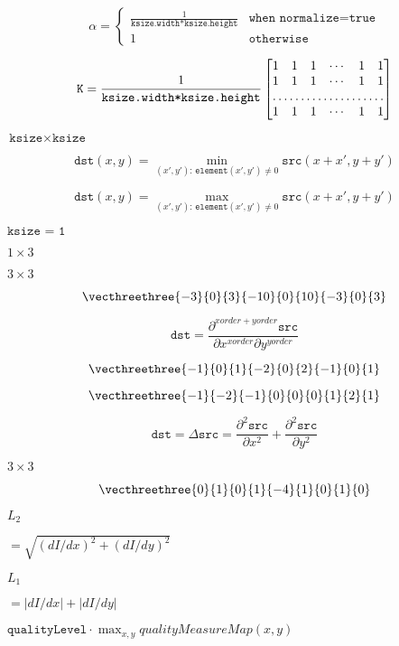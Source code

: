 \documentclass{article}
\begin{document}
\[\alpha = \begin{cases} \frac{1}{\texttt{ksize.width*ksize.height}} & \texttt{when } \texttt{normalize=true} \\1 & \texttt{otherwise} \end{cases}\]
\pagebreak

\[\texttt{K} = \frac{1}{\texttt{ksize.width*ksize.height}} \begin{bmatrix} 1 & 1 & 1 & \cdots & 1 & 1 \\ 1 & 1 & 1 & \cdots & 1 & 1 \\ \hdotsfor{6} \\ 1 & 1 & 1 & \cdots & 1 & 1 \\ \end{bmatrix}\]
\pagebreak

$\texttt{ksize} \times \texttt{ksize}$
\pagebreak

\[\texttt{dst} (x,y) = \min _{(x',y'): \, \texttt{element} (x',y') \ne0 } \texttt{src} (x+x',y+y')\]
\pagebreak

\[\texttt{dst} (x,y) = \max _{(x',y'): \, \texttt{element} (x',y') \ne0 } \texttt{src} (x+x',y+y')\]
\pagebreak

$\texttt{ksize = 1}$
\pagebreak

$1 \times 3$
\pagebreak

$3\times3$
\pagebreak

\[\vecthreethree{-3}{0}{3}{-10}{0}{10}{-3}{0}{3}\]
\pagebreak

\[\texttt{dst} = \frac{\partial^{xorder+yorder} \texttt{src}}{\partial x^{xorder} \partial y^{yorder}}\]
\pagebreak

\[\vecthreethree{-1}{0}{1}{-2}{0}{2}{-1}{0}{1}\]
\pagebreak

\[\vecthreethree{-1}{-2}{-1}{0}{0}{0}{1}{2}{1}\]
\pagebreak

\[\texttt{dst} = \Delta \texttt{src} = \frac{\partial^2 \texttt{src}}{\partial x^2} + \frac{\partial^2 \texttt{src}}{\partial y^2}\]
\pagebreak

$3 \times 3$
\pagebreak

\[\vecthreethree {0}{1}{0}{1}{-4}{1}{0}{1}{0}\]
\pagebreak

$L_2$
\pagebreak

$=\sqrt{(dI/dx)^2 + (dI/dy)^2}$
\pagebreak

$L_1$
\pagebreak

$=|dI/dx|+|dI/dy|$
\pagebreak

$\texttt{qualityLevel} \cdot \max_{x,y} qualityMeasureMap(x,y)$
\pagebreak
\end{document}

